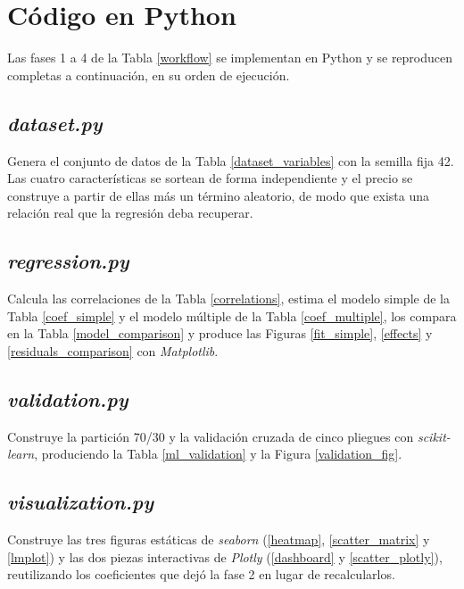 \section{Código en Python}
    \label{anexo_python}
    Las fases 1 a 4 de la Tabla \ref{workflow} se implementan en Python y se
    reproducen completas a continuación, en su orden de ejecución.

    \subsection{\textit{dataset.py}}
        Genera el conjunto de datos de la Tabla \ref{dataset_variables} con la
        semilla fija 42. Las cuatro características se sortean de forma
        independiente y el precio se construye a partir de ellas más un término
        aleatorio, de modo que exista una relación real que la regresión deba
        recuperar.

        \vspace{10pt}

        

    \subsection{\textit{regression.py}}
        Calcula las correlaciones de la Tabla \ref{correlations}, estima el modelo
        simple de la Tabla \ref{coef_simple} y el modelo múltiple de la Tabla
        \ref{coef_multiple}, los compara en la Tabla \ref{model_comparison} y
        produce las Figuras \ref{fit_simple}, \ref{effects} y 
        \ref{residuals_comparison} con \textit{Matplotlib}.

        \vspace{10pt}

        

    \subsection{\textit{validation.py}}
        Construye la partición 70/30 y la validación cruzada de cinco pliegues con
        \textit{scikit-learn}, produciendo la Tabla \ref{ml_validation} y la Figura
        \ref{validation_fig}.

        \vspace{10pt}

        

    \subsection{\textit{visualization.py}}
        Construye las tres figuras estáticas de \textit{seaborn} (\ref{heatmap},
        \ref{scatter_matrix} y \ref{lmplot}) y las dos piezas interactivas de
        \textit{Plotly} (\ref{dashboard} y \ref{scatter_plotly}), reutilizando los
        coeficientes que dejó la fase 2 en lugar de recalcularlos.

        \vspace{10pt}

        
